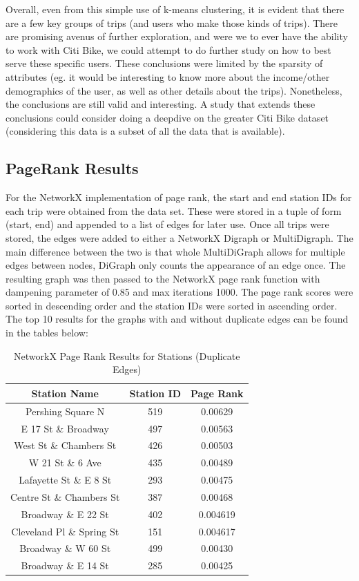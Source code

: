 \documentclass{article}
\begin{document}
Overall, even from this simple use of k-means clustering, it is evident that there are a few key groups of trips (and users who make those kinds of trips). There are promising avenus of further exploration, and were we to ever have the ability to work with Citi Bike, we could attempt to do further study on how to best serve these specific users. These conclusions were limited by the sparsity of attributes (eg. it would be interesting to know more about the income/other demographics of the user, as well as other details about the trips). Nonetheless, the conclusions are still valid and interesting. A study that extends these conclusions could consider doing a deepdive on the greater Citi Bike dataset (considering this data is a subset of all the data that is available). 


\subsection{PageRank Results}
For the NetworkX implementation of page rank,  the start and end station IDs for each trip were obtained from the data set. These were stored in a tuple of form (start, end) and appended to a list of edges for later use. Once all trips were stored, the edges were added to either a NetworkX Digraph or MultiDigraph. The main difference between the two is that whole MultiDiGraph allows for multiple edges between nodes, DiGraph only counts the appearance of an edge once. The resulting graph was then passed to the NetworkX page rank function with dampening parameter of 0.85 and max iterations 1000. The page rank scores  were sorted in descending order and the station IDs were sorted in ascending order. The top 10 results for the graphs with and without duplicate edges can be found in the tables below: 
\begin{table}[h!]
\caption{NetworkX Page Rank Results for Stations (Duplicate Edges)}
\centering
 \begin{tabular}{||c c c||} 
 \hline
 Station Name & Station ID & Page Rank \\ [0.5ex] 
 \hline\hline
 Pershing Square N & 519 & 0.00629\\ 
 E 17 St \& Broadway & 497 & 0.00563\\
 West St \& Chambers St & 426 & 0.00503\\ 
 W 21 St \& 6 Ave & 435 & 0.00489\\
 Lafayette St \& E 8 St & 293 & 0.00475\\
 Centre St \& Chambers St & 387 & 0.00468\\
 Broadway \& E 22 St & 402 & 0.004619\\
 Cleveland Pl \& Spring St & 151 & 0.004617\\
 Broadway \& W 60 St & 499 & 0.00430\\
 Broadway \& E 14 St & 285 & 0.00425\\[1ex] 
 \hline
 \end{tabular}
 \end{table}
\end{document}
